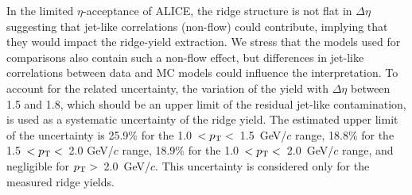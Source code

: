 In the limited $\eta$-acceptance of ALICE, the ridge structure is not flat in $\Delta \eta$ suggesting that jet-like correlations (non-flow) could contribute, implying that they would impact the ridge-yield extraction. We stress that the models used for comparisons also contain such a non-flow effect, but differences in jet-like correlations between data and MC models could influence the interpretation. To account for the related uncertainty, the variation of the yield with $\Delta\eta$ between 1.5 and 1.8, which should be an upper limit of the residual jet-like contamination, is used as a systematic uncertainty of the ridge yield. The estimated upper limit of the uncertainty is 25.9\% for the 1.0~$<p_\mathrm{T}<$~1.5~GeV/$c$ range, 18.8\% for the 1.5~$<p_\mathrm{T}<$~2.0 GeV/$c$ range, 18.9\% for the 1.0~$<p_\mathrm{T}<$~2.0~GeV/$c$ range, and negligible for $p_\mathrm{T}>$~2.0~GeV/$c$. This uncertainty is considered only for the measured ridge yields.








